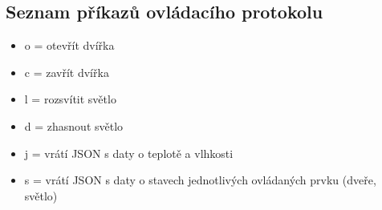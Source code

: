 \subsection*{Seznam příkazů ovládacího protokolu}
\begin{itemize}
    \item o = otevřít dvířka
    \item c = zavřít dvířka
    \item l = rozsvítit světlo
    \item d = zhasnout světlo
    \item j = vrátí JSON s daty o teplotě a vlhkosti
    \item s = vrátí JSON s daty o stavech jednotlivých ovládaných prvku (dveře, světlo)
\end{itemize}




%
%
%
%